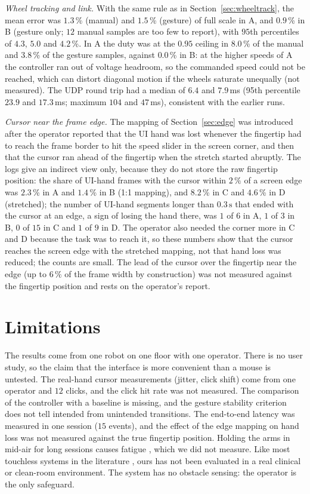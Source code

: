 \documentclass[5p,twocolumn]{elsarticle}
\begin{document}
\emph{Wheel tracking and link.} With the same rule as in Section~\ref{sec:wheeltrack}, the mean error was $1.3$\,\% (manual) and $1.5$\,\% (gesture) of full scale in A, and $0.9$\,\% in B (gesture only; $12$ manual samples are too few to report), with $95$th percentiles of $4.3$, $5.0$ and $4.2$\,\%. In A the duty was at the $0.95$ ceiling in $8.0$\,\% of the manual and $3.8$\,\% of the gesture samples, against $0.0$\,\% in B: at the higher speeds of A the controller ran out of voltage headroom, so the commanded speed could not be reached, which can distort diagonal motion if the wheels saturate unequally (not measured). The UDP round trip had a median of $6.4$ and $7.9$\,ms (95th percentile $23.9$ and $17.3$\,ms; maximum $104$ and $47$\,ms), consistent with the earlier runs.

\emph{Cursor near the frame edge.} The mapping of Section~\ref{sec:edge} was introduced after the operator reported that the UI hand was lost whenever the fingertip had to reach the frame border to hit the speed slider in the screen corner, and then that the cursor ran ahead of the fingertip when the stretch started abruptly. The logs give an indirect view only, because they do not store the raw fingertip position: the share of UI-hand frames with the cursor within $2\,\%$ of a screen edge was $2.3$\,\% in A and $1.4$\,\% in B (1:1 mapping), and $8.2$\,\% in C and $4.6$\,\% in D (stretched); the number of UI-hand segments longer than $0.3\,\mathrm{s}$ that ended with the cursor at an edge, a sign of losing the hand there, was $1$ of $6$ in A, $1$ of $3$ in B, $0$ of $15$ in C and $1$ of $9$ in D. The operator also needed the corner more in C and D because the task was to reach it, so these numbers show that the cursor reaches the screen edge with the stretched mapping, not that hand loss was reduced; the counts are small. The lead of the cursor over the fingertip near the edge (up to $6\,\%$ of the frame width by construction) was not measured against the fingertip position and rests on the operator's report.

\section{Limitations}\label{sec:limits}
The results come from one robot on one floor with one operator. There is no user study, so the claim that the interface is more convenient than a mouse is untested. The real-hand cursor measurements (jitter, click shift) come from one operator and $12$ clicks, and the click hit rate was not measured. The comparison of the controller with a baseline is missing, and the gesture stability criterion does not tell intended from unintended transitions. The end-to-end latency was measured in one session ($15$ events), and the effect of the edge mapping on hand loss was not measured against the true fingertip position. Holding the arms in mid-air for long sessions causes fatigue \cite{hincapie2014}, which we did not measure. Like most touchless systems in the literature \cite{mewes2017}, ours has not been evaluated in a real clinical or clean-room environment. The system has no obstacle sensing: the operator is the only safeguard.
\end{document}
